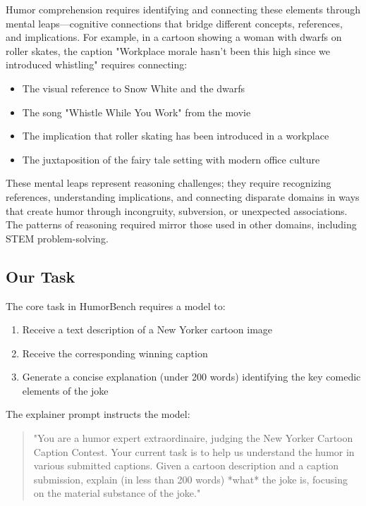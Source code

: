 \documentclass[twocolumn]{article}
\begin{document}
Humor comprehension requires identifying and connecting these elements through mental leaps—cognitive connections that bridge different concepts, references, and implications. For example, in a cartoon showing a woman with dwarfs on roller skates, the caption "Workplace morale hasn't been this high since we introduced whistling" requires connecting:
\begin{itemize}
    \item The visual reference to Snow White and the dwarfs
    \item The song "Whistle While You Work" from the movie
    \item The implication that roller skating has been introduced in a workplace
    \item The juxtaposition of the fairy tale setting with modern office culture
\end{itemize}

These mental leaps represent reasoning challenges; they require recognizing references, understanding implications, and connecting disparate domains in ways that create humor through incongruity, subversion, or unexpected associations. The patterns of reasoning required mirror those used in other domains, including STEM problem-solving.

\subsection{Our Task}

The core task in HumorBench requires a model to:
\begin{enumerate}
    \item Receive a text description of a New Yorker cartoon image
    \item Receive the corresponding winning caption
    \item Generate a concise explanation (under 200 words) identifying the key comedic elements of the joke
\end{enumerate}

The explainer prompt instructs the model:
\begin{quote}
"You are a humor expert extraordinaire, judging the New Yorker Cartoon Caption Contest. Your current task is to help us understand the humor in various submitted captions. Given a cartoon description and a caption submission, explain (in less than 200 words) *what* the joke is, focusing on the material substance of the joke."
\end{quote}
\end{document}
